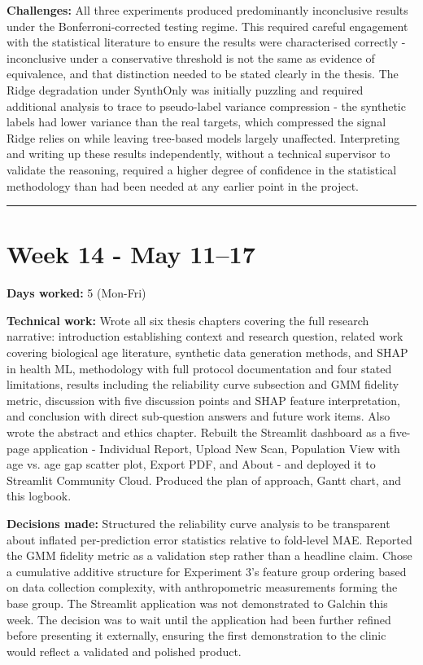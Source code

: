 \documentclass[11pt,a4paper]{article}
\begin{document}
\textbf{Challenges:} All three experiments produced predominantly inconclusive results under the Bonferroni-corrected testing regime. This required careful engagement with the statistical literature to ensure the results were characterised correctly  -  inconclusive under a conservative threshold is not the same as evidence of equivalence, and that distinction needed to be stated clearly in the thesis. The Ridge degradation under SynthOnly was initially puzzling and required additional analysis to trace to pseudo-label variance compression  -  the synthetic labels had lower variance than the real targets, which compressed the signal Ridge relies on while leaving tree-based models largely unaffected. Interpreting and writing up these results independently, without a technical supervisor to validate the reasoning, required a higher degree of confidence in the statistical methodology than had been needed at any earlier point in the project.
\noindent\rule{\textwidth}{0.4pt}


\section{Week 14  -  May 11–17}

\textbf{Days worked:} 5 (Mon-Fri)

\textbf{Technical work:} Wrote all six thesis chapters covering the full research narrative: introduction establishing context and research question, related work covering biological age literature, synthetic data generation methods, and SHAP in health ML, methodology with full protocol documentation and four stated limitations, results including the reliability curve subsection and GMM fidelity metric, discussion with five discussion points and SHAP feature interpretation, and conclusion with direct sub-question answers and future work items. Also wrote the abstract and ethics chapter. Rebuilt the Streamlit dashboard as a five-page application  -  Individual Report, Upload New Scan, Population View with age vs. age gap scatter plot, Export PDF, and About  -  and deployed it to Streamlit Community Cloud. Produced the plan of approach, Gantt chart, and this logbook.

\textbf{Decisions made:} Structured the reliability curve analysis to be transparent about inflated per-prediction error statistics relative to fold-level MAE. Reported the GMM fidelity metric as a validation step rather than a headline claim. Chose a cumulative additive structure for Experiment 3's feature group ordering based on data collection complexity, with anthropometric measurements forming the base group. The Streamlit application was not demonstrated to Galchin this week. The decision was to wait until the application had been further refined before presenting it externally, ensuring the first demonstration to the clinic would reflect a validated and polished product.
\end{document}
